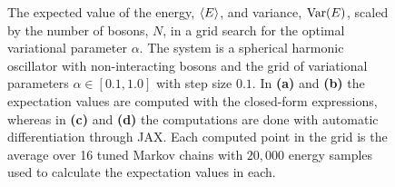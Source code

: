 \begin{figure}[!htb]
\centering
{}
\qquad
{}
\qquad
{}
\qquad
{}
\caption{The expected value of the energy, $\expval{E}$, and variance, $\mathrm{Var} \qty(E)$, scaled  by the number of bosons, $N$, in a grid search for the optimal variational parameter $\alpha$. The system is a spherical harmonic oscillator with non-interacting bosons and the grid of variational parameters $\alpha \in [0.1, 1.0]$ with step size $0.1$. In \textbf{(a)} and \textbf{(b)} the expectation values are computed with the closed-form expressions, whereas in \textbf{(c)} and \textbf{(d)} the computations are done with automatic differentiation through JAX. Each computed point in the grid is the average over 16 tuned Markov chains with $20,000$ energy samples used to calculate the expectation values in each.}
\label{fig:grid_search}
\end{figure}

